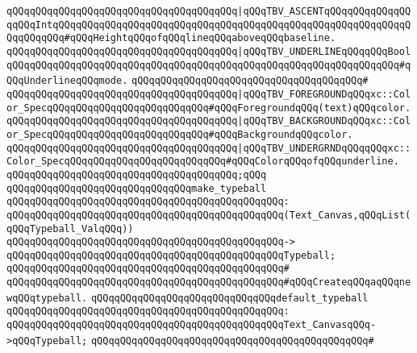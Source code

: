 \verb|qQQqqQQqqQQqqQQqqQQqqQQqqQQqqQQqqQQqqQQq|\verb#|qQQqTBV_ASCENTqQQqqQQqqQQqqQQqqQQqIntqQQqqQQqqQQqqQQqqQQqqQQqqQQqqQQqqQQqqQQqqQQqqQQqqQQqqQQqqQQqqQQqqQQqqQQq#\verb|#qQQqHeightqQQqofqQQqlineqQQqaboveqQQqbaseline.|\newline
\verb|qQQqqQQqqQQqqQQqqQQqqQQqqQQqqQQqqQQqqQQq|\verb#|qQQqTBV_UNDERLINEqQQqqQQqBoolqQQqqQQqqQQqqQQqqQQqqQQqqQQqqQQqqQQqqQQqqQQqqQQqqQQqqQQqqQQqqQQqqQQq#\verb|#qQQqUnderlineqQQqmode.|\newline
\verb|qQQqqQQqqQQqqQQqqQQqqQQqqQQqqQQqqQQqqQQq#|\newline
\verb|qQQqqQQqqQQqqQQqqQQqqQQqqQQqqQQqqQQqqQQq|\verb#|qQQqTBV_FOREGROUNDqQQqxc::Color_SpecqQQqqQQqqQQqqQQqqQQqqQQqqQQq#\verb|#qQQqForegroundqQQq(text)qQQqcolor.|\newline
\verb|qQQqqQQqqQQqqQQqqQQqqQQqqQQqqQQqqQQqqQQq|\verb#|qQQqTBV_BACKGROUNDqQQqxc::Color_SpecqQQqqQQqqQQqqQQqqQQqqQQqqQQq#\verb|#qQQqBackgroundqQQqcolor.|\newline
\verb|qQQqqQQqqQQqqQQqqQQqqQQqqQQqqQQqqQQqqQQq|\verb#|qQQqTBV_UNDERGRNDqQQqqQQqxc::Color_SpecqQQqqQQqqQQqqQQqqQQqqQQqqQQq#\verb|#qQQqColorqQQqofqQQqunderline.|\newline
\verb|qQQqqQQqqQQqqQQqqQQqqQQqqQQqqQQqqQQqqQQq;qQQq|\newline
\newline
\verb|qQQqqQQqqQQqqQQqqQQqqQQqqQQqqQQqmake_typeball|\newline
\verb|qQQqqQQqqQQqqQQqqQQqqQQqqQQqqQQqqQQqqQQqqQQqqQQq:|\newline
\verb|qQQqqQQqqQQqqQQqqQQqqQQqqQQqqQQqqQQqqQQqqQQqqQQq(Text_Canvas,qQQqList(qQQqTypeball_ValqQQq))|\newline
\verb|qQQqqQQqqQQqqQQqqQQqqQQqqQQqqQQqqQQqqQQqqQQqqQQq->|\newline
\verb|qQQqqQQqqQQqqQQqqQQqqQQqqQQqqQQqqQQqqQQqqQQqqQQqTypeball;|\newline
\verb|qQQqqQQqqQQqqQQqqQQqqQQqqQQqqQQqqQQqqQQqqQQqqQQq#|\newline
\verb|qQQqqQQqqQQqqQQqqQQqqQQqqQQqqQQqqQQqqQQqqQQqqQQq#qQQqCreateqQQqaqQQqnewqQQqtypeball.|\newline
\newline
\verb|qQQqqQQqqQQqqQQqqQQqqQQqqQQqqQQqdefault_typeball|\newline
\verb|qQQqqQQqqQQqqQQqqQQqqQQqqQQqqQQqqQQqqQQqqQQqqQQq:|\newline
\verb|qQQqqQQqqQQqqQQqqQQqqQQqqQQqqQQqqQQqqQQqqQQqqQQqText_CanvasqQQq->qQQqTypeball;|\newline
\verb|qQQqqQQqqQQqqQQqqQQqqQQqqQQqqQQqqQQqqQQqqQQqqQQq#|\newline
